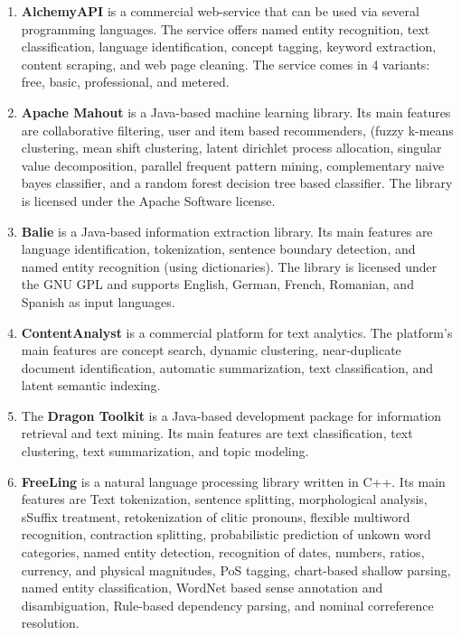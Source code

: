 \documentclass[a4paper,twoside]{book}      %
\begin{document}
\begin{enumerate}
\item \textbf{AlchemyAPI} \cite{alchemyapi} is a commercial web-service that can be used via several programming languages. The service offers named entity recognition, text classification, language identification, concept tagging, keyword extraction, content scraping, and web page cleaning.
The service comes in 4 variants: free, basic, professional, and metered.
\item \textbf{Apache Mahout} \cite{settings2apache} is a Java-based machine learning library. Its main features are collaborative filtering, user and item based recommenders, (fuzzy k-means clustering, mean shift clustering, latent dirichlet process allocation, singular value decomposition, parallel frequent pattern mining, complementary naive bayes classifier, and a random forest decision tree based classifier.
The library is licensed under the Apache Software license.
\item \textbf{Balie} \cite{balie} is a Java-based information extraction library. Its main features are language identification, tokenization, sentence boundary detection, and named entity recognition (using dictionaries).
The library is licensed under the GNU GPL and supports English, German, French, Romanian, and Spanish as input languages.
\item \textbf{ContentAnalyst} \cite{contentanalyst} is a commercial platform for text analytics. The platform's main features are concept search, dynamic clustering, near-duplicate document identification, automatic summarization, text classification, and latent semantic indexing.
\item The \textbf{Dragon Toolkit} \cite{zhou2007dragon} is a Java-based development package for information retrieval and text mining. Its main features are text classification, text clustering, text summarization, and topic modeling.
\item \textbf{FreeLing} \cite{atserias2006freeling} is a natural language processing library written in C++. Its main features are Text tokenization, sentence splitting, morphological analysis, sSuffix treatment, retokenization of clitic pronouns, flexible multiword recognition, contraction splitting, probabilistic prediction of unkown word categories, named entity detection, recognition of dates, numbers, ratios, currency, and physical magnitudes, PoS tagging, chart-based shallow parsing, named entity classification,  WordNet based sense annotation and disambiguation, Rule-based dependency parsing, and nominal correference resolution.

\end{enumerate}
\end{document}
